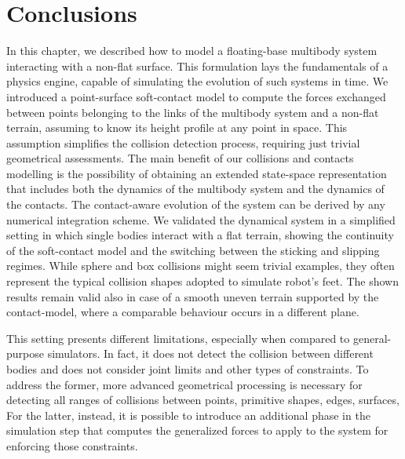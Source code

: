 \section{Conclusions}

In this chapter, we described how to model a floating-base multibody system interacting with a non-flat surface.
This formulation lays the fundamentals of a physics engine, capable of simulating the evolution of such systems in time.
We introduced a point-surface soft-contact model to compute the forces exchanged between points belonging to the links of the multibody system and a non-flat terrain, assuming to know its height profile at any point in space.
This assumption simplifies the collision detection process, requiring just trivial geometrical assessments.
The main benefit of our collisions and contacts modelling is the possibility of obtaining an extended state-space representation that includes both the dynamics of the multibody system and the dynamics of the contacts.
The contact-aware evolution of the system can be derived by any numerical integration scheme.
We validated the dynamical system in a simplified setting in which single bodies interact with a flat terrain, showing the continuity of the soft-contact model and the switching between the sticking and slipping regimes.
While sphere and box collisions might seem trivial examples, they often represent the typical collision shapes adopted to simulate robot's feet.
The shown results remain valid also in case of a smooth uneven terrain supported by the contact-model, where a comparable behaviour occurs in a different plane.

This setting presents different limitations, especially when compared to general-purpose simulators.
In fact, it does not detect the collision between different bodies and does not consider joint limits and other types of constraints.
To address the former, more advanced geometrical processing is necessary for detecting all ranges of collisions between points, primitive shapes, edges, surfaces, \etc
For the latter, instead, it is possible to introduce an additional phase in the simulation step that computes the generalized forces to apply to the system for enforcing those constraints.
